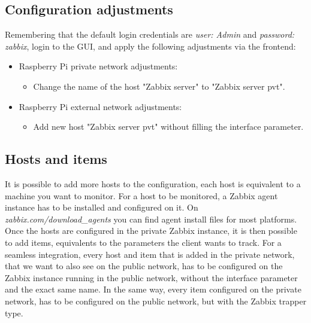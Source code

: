 \documentclass[a4paper,11pt]{scrartcl}
\begin{document}
\subsection{Configuration adjustments}
Remembering that the default login credentials are \textit{user: Admin} and \textit{password: zabbix}, login to the GUI, and apply the following adjustments via the frontend:
\begin{itemize}
    \item Raspberry Pi private network adjustments:
    \begin{itemize}
        \item Change the name of the host "Zabbix server" to "Zabbix server pvt".
    \end{itemize}
    \item Raspberry Pi external network adjustments:
    \begin{itemize}
        \item Add new host "Zabbix server pvt" without filling the interface parameter.    
    \end{itemize}
\end{itemize}

\subsection{Hosts and items}
It is possible to add more hosts to the configuration, each host is equivalent to a machine you want to monitor. For a host to be monitored, a Zabbix agent instance has to be installed and configured on it. On \textit{zabbix.com/download\_agents} you can find agent install files for most platforms. Once the hosts are configured in the private Zabbix instance, it is then possible to add items, equivalents to the parameters the client wants to track. For a seamless integration, every host and item that is added in the private network, that we want to also see on the public network, has to be configured on the Zabbix instance running in the public network, without the interface parameter and the exact same name. In the same way, every item configured on the private network, has to be configured on the public network, but with the Zabbix trapper type.
\end{document}
